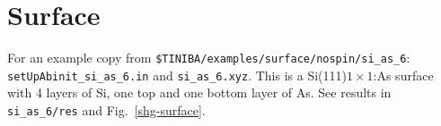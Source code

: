 \section{Surface} 
For an example copy from \verb=$TINIBA/examples/surface/nospin/si_as_6=:\\
\verb=setUpAbinit_si_as_6.in= and \verb=si_as_6.xyz=. This is a
Si(111)$1\times 1$:As surface with 4 layers of Si, one top and one bottom
layer of As. See results in \verb=si_as_6/res= and Fig.~\ref{shg-surface}.
